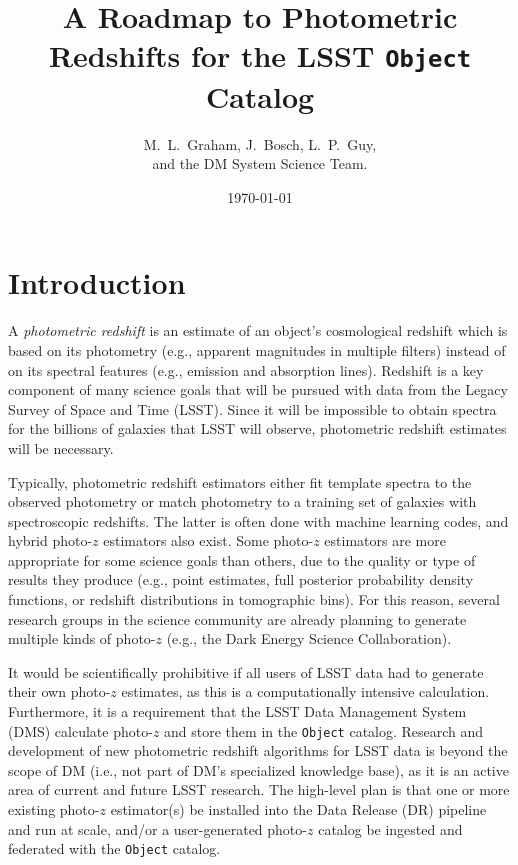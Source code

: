 \documentclass[DM,lsstdraft,toc]{lsstdoc}
\title[Photo-$z$ for LSST Objects]{A Roadmap to Photometric Redshifts for the LSST {\tt Object} Catalog}
\author{M.~L.~Graham, J.~Bosch, L.~P.~Guy, \\ and the DM System Science Team.}
\date{\today}
\begin{document}
\maketitle




\section{Introduction} \label{sec:intro}

A {\it photometric redshift} is an estimate of an object's cosmological redshift which is based on its photometry (e.g., apparent magnitudes in multiple filters) instead of on its spectral features (e.g., emission and absorption lines). 
Redshift is a key component of many science goals that will be pursued with data from the Legacy Survey of Space and Time (LSST).
Since it will be impossible to obtain spectra for the billions of galaxies that LSST will observe, photometric redshift estimates will be necessary.

Typically, photometric redshift estimators either fit template spectra to the observed photometry or match photometry to a training set of galaxies with spectroscopic redshifts. 
The latter is often done with machine learning codes, and hybrid photo-$z$ estimators also exist. 
Some photo-$z$ estimators are more appropriate for some science goals than others, due to the quality or type of results they produce (e.g., point estimates, full posterior probability density functions, or redshift distributions in tomographic bins).
For this reason, several research groups in the science community are already planning to generate multiple kinds of photo-$z$ (e.g., the Dark Energy Science Collaboration).

It would be scientifically prohibitive if all users of LSST data had to generate their own photo-$z$ estimates, as this is a computationally intensive calculation.
Furthermore, it is a requirement that the LSST Data Management System (DMS) calculate photo-$z$ and store them in the {\tt Object} catalog.
Research and development of new photometric redshift algorithms for LSST data is beyond the scope of DM (i.e., not part of DM's specialized knowledge base), as it is an active area of current and future LSST research.
The high-level plan is that one or more existing photo-$z$ estimator(s) be installed into the Data Release (DR) pipeline and run at scale, and/or a user-generated photo-$z$ catalog be ingested and federated with the {\tt Object} catalog.
\end{document}
